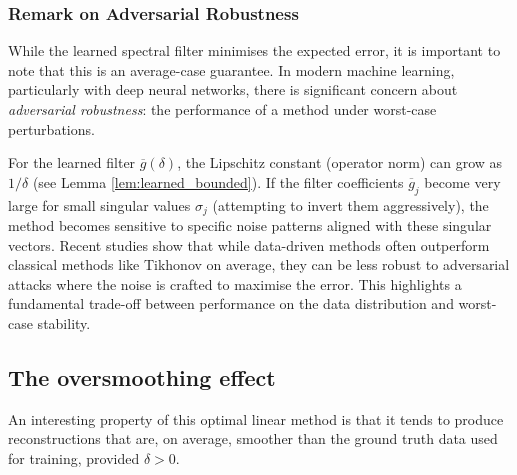 \subsubsection{Remark on Adversarial Robustness}
While the learned spectral filter minimises the expected error, it is important to note that this is an average-case guarantee. In modern machine learning, particularly with deep neural networks, there is significant concern about \emph{adversarial robustness}: the performance of a method under worst-case perturbations.

For the learned filter $\overline{g}(\delta)$, the Lipschitz constant (operator norm) can grow as $1/\delta$ (see Lemma \ref{lem:learned_bounded}). If the filter coefficients $\overline{g}_j$ become very large for small singular values $\sigma_j$ (attempting to invert them aggressively), the method becomes sensitive to specific noise patterns aligned with these singular vectors. Recent studies \cite{kabri_convergent_2024} show that while data-driven methods often outperform classical methods like Tikhonov on average, they can be less robust to adversarial attacks where the noise is crafted to maximise the error. This highlights a fundamental trade-off between performance on the data distribution and worst-case stability.

\subsection{The oversmoothing effect}

An interesting property of this optimal linear method is that it tends to produce reconstructions that are, on average, smoother than the ground truth data used for training, provided $\delta > 0$.

